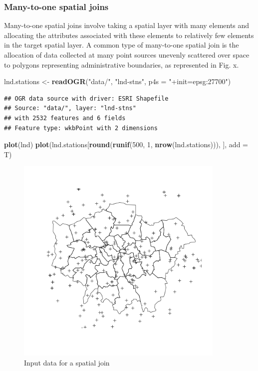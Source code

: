 \documentclass[]{article}
\newenvironment{Shaded}{}{}
\newcommand{\KeywordTok}[1]{\textcolor[rgb]{0.00,0.44,0.13}{\textbf{{#1}}}}
\newcommand{\DataTypeTok}[1]{\textcolor[rgb]{0.56,0.13,0.00}{{#1}}}
\newcommand{\DecValTok}[1]{\textcolor[rgb]{0.25,0.63,0.44}{{#1}}}
\newcommand{\StringTok}[1]{\textcolor[rgb]{0.25,0.44,0.63}{{#1}}}
\newcommand{\NormalTok}[1]{{#1}}
\let\Oldincludegraphics\includegraphics
\renewcommand{\includegraphics}[1]{\Oldincludegraphics[width=10cm]{#1}}
\begin{document}
\subsubsection{Many-to-one spatial joins}

Many-to-one spatial joins involve taking a spatial layer with many
elements and allocating the attributes associated with these elements to
relatively few elements in the target spatial layer. A common type of
many-to-one spatial join is the allocation of data collected at many
point sources unevenly scattered over space to polygons representing
administrative boundaries, as represented in Fig. x.

\begin{Shaded}
\begin{Highlighting}[]
\NormalTok{lnd.stations <- }\KeywordTok{readOGR}\NormalTok{(}\StringTok{"data/"}\NormalTok{, }\StringTok{"lnd-stns"}\NormalTok{, }\DataTypeTok{p4s =} \StringTok{"+init=epsg:27700"}\NormalTok{)}
\end{Highlighting}
\end{Shaded}
\begin{verbatim}
## OGR data source with driver: ESRI Shapefile 
## Source: "data/", layer: "lnd-stns"
## with 2532 features and 6 fields
## Feature type: wkbPoint with 2 dimensions
\end{verbatim}
\begin{Shaded}
\begin{Highlighting}[]
\KeywordTok{plot}\NormalTok{(lnd)}
\KeywordTok{plot}\NormalTok{(lnd.stations[}\KeywordTok{round}\NormalTok{(}\KeywordTok{runif}\NormalTok{(}\DecValTok{500}\NormalTok{, }\DecValTok{1}\NormalTok{, }\KeywordTok{nrow}\NormalTok{(lnd.stations))), ], }\DataTypeTok{add =} \NormalTok{T)}
\end{Highlighting}
\end{Shaded}
\begin{figure}[htbp]
\centering
\includegraphics{figure/Input_data_for_a_spatial_join.png}
\caption{Input data for a spatial join}
\end{figure}
\end{document}
